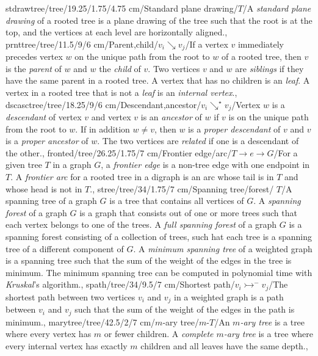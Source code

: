 stdrawtree/tree/19.25/1.75/4.75 cm/{Standard plane drawing}/{\smallpencil $T$}/{A \emph{standard plane drawing} of a rooted tree is a plane drawing of the tree such that the root is at the top, and the vertices at each level are horizontally aligned.},%
prnttree/tree/11.5/9/6 cm/{Parent,child}/{$v_i\searrow v_j$}/{If a vertex $v$ immediately precedes vertex $w$ on the unique path from the root to $w$ of a rooted tree, then $v$ is the \emph{parent} of $w$ and $w$ the \emph{child} of $v$. Two vertices $v$ and $w$ are \emph{siblings} if they have the same parent in a rooted tree. A vertex that has no children is an \emph{leaf}. A vertex in a rooted tree that is not a \emph{leaf} is an \emph{internal vertex}.},%
dscasctree/tree/18.25/9/6 cm/{Descendant,ancestor}/{$v_i\searrow^{\star} v_j$}/{Vertex $w$ is a \emph{descendant} of vertex $v$ and vertex $v$ is an \emph{ancestor} of $w$ if $v$ is on the unique path from the root to $w$. If in addition $w\neq v$, then $w$ is a \emph{proper descendant} of $v$ and $v$ is a \emph{proper ancestor} of $w$. The two vertices are \emph{related} if one is a descendant of the other.},%
fronted/tree/26.25/1.75/7 cm/{Frontier edge/arc}/{$T\rightarrow e\rightarrow G$}/{For a given tree $T$ in a graph $G$, a \emph{frontier edge} is a non-tree edge with one endpoint in $T$. A \emph{frontier arc} for a rooted tree in a digraph is an arc whose tail is in $T$ and whose head is not in $T$.},
stree/tree/34/1.75/7 cm/{Spanning tree/forest}/{\spanning{} $T$}/{A spanning tree of a graph $G$ is a tree that contains all vertices of $G$. A \emph{spanning forest} of a graph $G$ is a graph that consists out of one or more trees such that each vertex belongs to one of the trees. A \emph{full spanning forest} of a graph $G$ is a spanning forest consisting of a collection of trees, such hat each tree is a spanning tree of a different component of $G$. A \emph{minimum spanning tree} of a weighted graph is a spanning tree such that the sum of the weight of the edges in the tree is minimum. The minimum spanning tree can be computed in polynomial time with \emph{Kruskal}'s algorithm.},%
spath/tree/34/9.5/7 cm/{Shortest path}/{$v_i\rightarrowtail^{-} v_j$}/{The shortest path between two vertices $v_i$ and $v_j$ in a weighted graph is a path between $v_i$ and $v_j$ such that the sum of the weight of the edges in the path is minimum.},%
marytree/tree/42.5/2/7 cm/{$m$-ary tree}/{$m$-$T$}/{An \emph{$m$-ary tree} is a tree where every vertex has $m$ or fewer children. A \emph{complete $m$-ary tree} is a tree where every internal vertex has exactly $m$ children and all leaves have the same depth.},%
